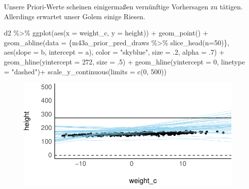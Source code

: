 \documentclass[
  a4paper,
  DIV=11]{scrreprt}
\newenvironment{Shaded}{\begin{snugshade}}{\end{snugshade}}
\newcommand{\AttributeTok}[1]{\textcolor[rgb]{0.40,0.45,0.13}{#1}}
\newcommand{\DecValTok}[1]{\textcolor[rgb]{0.68,0.00,0.00}{#1}}
\newcommand{\FunctionTok}[1]{\textcolor[rgb]{0.28,0.35,0.67}{#1}}
\newcommand{\NormalTok}[1]{\textcolor[rgb]{0.00,0.23,0.31}{#1}}
\newcommand{\SpecialCharTok}[1]{\textcolor[rgb]{0.37,0.37,0.37}{#1}}
\newcommand{\StringTok}[1]{\textcolor[rgb]{0.13,0.47,0.30}{#1}}
\theoremstyle{definition}
\theoremstyle{remark}
\begin{document}
Unsere Priori-Werte scheinen einigermaßen vernünftige Vorhersagen zu
tätigen. Allerdings erwartet unser Golem einige Riesen.

\begin{Shaded}
\begin{Highlighting}[]
\NormalTok{d2 }\SpecialCharTok{\%\textgreater{}\%} 
  \FunctionTok{ggplot}\NormalTok{(}\FunctionTok{aes}\NormalTok{(}\AttributeTok{x =}\NormalTok{ weight\_c, }\AttributeTok{y =}\NormalTok{ height)) }\SpecialCharTok{+}
  \FunctionTok{geom\_point}\NormalTok{() }\SpecialCharTok{+}
  \FunctionTok{geom\_abline}\NormalTok{(}\AttributeTok{data =}\NormalTok{ \{m43a\_prior\_pred\_draws }\SpecialCharTok{\%\textgreater{}\%} \FunctionTok{slice\_head}\NormalTok{(}\AttributeTok{n=}\DecValTok{50}\NormalTok{)\},}
              \FunctionTok{aes}\NormalTok{(}\AttributeTok{slope =}\NormalTok{ b,}
                  \AttributeTok{intercept =}\NormalTok{ a),}
              \AttributeTok{color =} \StringTok{"skyblue"}\NormalTok{,}
              \AttributeTok{size =}\NormalTok{ .}\DecValTok{2}\NormalTok{,}
              \AttributeTok{alpha =}\NormalTok{ .}\DecValTok{7}\NormalTok{) }\SpecialCharTok{+}
  \FunctionTok{geom\_hline}\NormalTok{(}\AttributeTok{yintercept =} \DecValTok{272}\NormalTok{, }\AttributeTok{size =}\NormalTok{ .}\DecValTok{5}\NormalTok{) }\SpecialCharTok{+}
  \FunctionTok{geom\_hline}\NormalTok{(}\AttributeTok{yintercept =} \DecValTok{0}\NormalTok{, }\AttributeTok{linetype =} \StringTok{"dashed"}\NormalTok{)}\SpecialCharTok{+}
  \FunctionTok{scale\_y\_continuous}\NormalTok{(}\AttributeTok{limits =} \FunctionTok{c}\NormalTok{(}\DecValTok{0}\NormalTok{, }\DecValTok{500}\NormalTok{)) }
\end{Highlighting}
\end{Shaded}

\begin{figure}[H]

{\centering \includegraphics{./lineare-modelle_files/figure-pdf/unnamed-chunk-14-1.pdf}

}

\end{figure}
\end{document}
